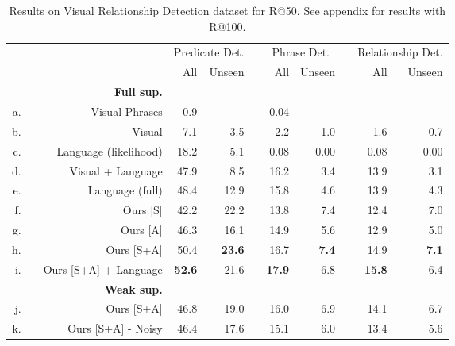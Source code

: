 \documentclass[10pt,twocolumn,letterpaper]{article}
\newcommand{\ra}[1]{\renewcommand{\arraystretch}{#1}}
\begin{document}
\begin{table*}\centering
{\small
\ra{1}
\begin{tabular}{@{}rrrrrcrrcrr@{}}\toprule
&& & \multicolumn{2}{c}{Predicate Det.} & \phantom{abc} & \multicolumn{2}{c}{Phrase Det.} & \phantom{abc}& \multicolumn{2}{c}{Relationship Det.}\\
&&								& All & Unseen && All & Unseen && All & Unseen \\\midrule
&& \textbf{Full sup.}\\
a. && Visual Phrases \cite{Sadeghi2011} &  0.9 	& -		&& 0.04 & -		&&  -    & - \\
b. && Visual \cite{Lu16} 				&  7.1	& 3.5	&& 2.2 	& 1.0	&&  1.6	 & 0.7 \\
c. && Language (likelihood) \cite{Lu16} 			& 18.2  &  5.1	&& 0.08	& 0.00	&& 0.08  & 0.00	\\
d. && Visual + Language \cite{Lu16} 	&  47.9 & 8.5	&& 16.2 & 3.4	&&  13.9 & 3.1 	\\
e. && Language (full) \cite{Lu16} 			&  48.4 & 12.9 	&& 15.8	& 4.6	&&  13.9 & 4.3	\\
\rule{0pt}{3ex}  
f. && Ours [S] 						&  42.2 & 22.2	&& 13.8	& 7.4	&& 	12.4 & 7.0	\\
g. && Ours [A] 						&  46.3 & 16.1	&& 14.9	& 5.6	&&	12.9 & 5.0	\\
h. && Ours [S+A] 					&  50.4 & \textbf{23.6} && 16.7  &\textbf{7.4}	&& 14.9 &  \textbf{7.1}	\\
i. && Ours [S+A] + Language \cite{Lu16} 
										& \textbf{52.6} & 21.6 && \textbf{17.9} & 6.8 && \textbf{15.8} & 6.4 \\
\rule{0pt}{3ex}  
 && \textbf{Weak sup.}\\
j. && Ours [S+A]					& 46.8 	& 19.0	&& 	16.0 & 6.9	&& 14.1 & 6.7	\\
k. && Ours [S+A] - Noisy 		& 46.4  	& 17.6	&& 	15.1& 6.0	&& 13.4 & 5.6	\\
\bottomrule
\end{tabular}
\setlength\abovecaptionskip{5pt}
\caption{Results on Visual Relationship Detection dataset \cite{Lu16} for R@50. See appendix for results with R@100.} 
\vspace{-.4cm}
\label{tab:results_vrd}
}
\end{table*}
\end{document}
